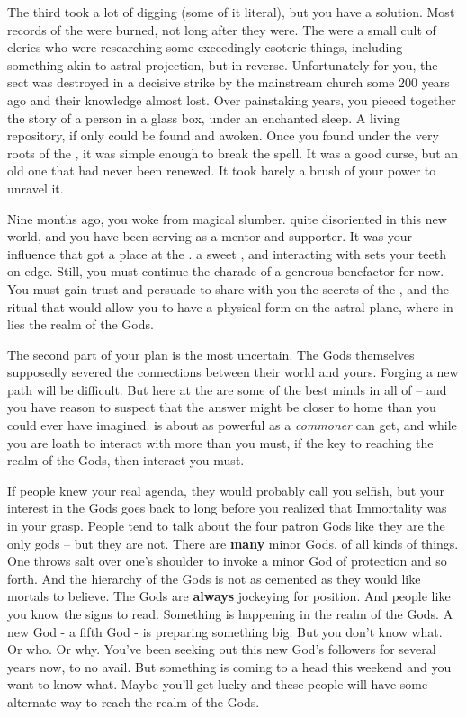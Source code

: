 \documentclass[char]{GL2020}
\begin{document}
The third took a lot of digging (some of it literal), but you have a solution. Most records of the \cDisneySect{} were burned, not long after they were. The \cDisneySect{} were a small cult of \cFarmGod{} clerics who were researching some exceedingly esoteric things, including something akin to astral projection, but in reverse. Unfortunately for you, the sect was destroyed in a decisive strike by the mainstream church some 200 years ago and their knowledge almost lost. Over painstaking years, you pieced together the story of a person in a glass box, under an enchanted sleep. A living repository, if only \cDisney{\they} could be found and awoken. Once you found \cDisney{\them} under the very roots of the \pSpine{}, it was simple enough to break the spell. It was a good curse, but an old one that had never been renewed. It took barely a brush of your power to unravel it.

Nine months ago, you woke \cDisney{} from \cDisney{\their} magical slumber. \cDisney{\They} \cDisney{\were} quite disoriented in this new world, and you have been serving as a mentor and supporter. It was your influence that got \cDisney{} a place at the \pSchool{}. \cDisney{\They} \cDisney{\are} a sweet \cDisney{\child}, and interacting with \cDisney{\them} sets your teeth on edge. Still, you must continue the charade of a generous benefactor for now. You must gain \cDisney{\their} trust and persuade \cDisney{\them} to share with you the secrets of the \cDisneySect{}, and the ritual that would allow you to have a physical form on the astral plane, where-in lies the realm of the Gods.

The second part of your plan is the most uncertain. The Gods themselves supposedly severed the connections between their world and yours. Forging a new path will be difficult. But here at the \pSc{} are some of the best minds in all of \pEarth{} -- and you have reason to suspect that the answer might be closer to home than you could ever have imagined. \cCurse{} is about as powerful as a \emph{commoner} can get, and while you are loath to interact with \cCurse{\them} more than you must, if \cCurse{\they} \cCurse{\have} the key to reaching the realm of the Gods, then interact you must.

If people knew your real agenda, they would probably call you selfish, but your interest in the Gods goes back to long before you realized that Immortality was in your grasp. People tend to talk about the four patron Gods like they are the only gods -- but they are not. There are \textbf{many} minor Gods, of all kinds of things. One throws salt over one’s shoulder to invoke a minor God of protection and so forth. And the hierarchy of the Gods is not as cemented as they would like mortals to believe. The Gods are \textbf{always} jockeying for position. And people like you know the signs to read. Something is happening in the realm of the Gods. A new God - a fifth God - is preparing something big. But you don’t know what. Or who. Or why. You’ve been seeking out this new God’s followers for several years now, to no avail. But something is coming to a head this weekend and you want to know what. Maybe you’ll get lucky and these people will have some alternate way to reach the realm of the Gods.
\end{document}
